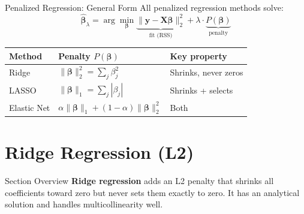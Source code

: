 \documentclass[aspectratio=169, 10pt]{beamer}
\begin{document}
\begin{frame}{Penalized Regression: General Form}
  All penalized regression methods solve:
  \[
    \hat{\bm{\beta}}_\lambda
    = \arg\min_{\bm{\beta}}
      \underbrace{\|\mathbf{y} - \mathbf{X}\bm{\beta}\|_2^2}_{\text{fit (RSS)}}
      + \lambda \cdot \underbrace{P(\bm{\beta})}_{\text{penalty}}
  \]

  \medskip
  \begin{center}
    \footnotesize
    \begin{tabular}{lll}
      \toprule
      \textbf{Method} & \textbf{Penalty} $P(\bm{\beta})$ & \textbf{Key property} \\
      \midrule
      Ridge      & $\|\bm{\beta}\|_2^2 = \sum_j \beta_j^2$              & Shrinks, never zeros \\
      LASSO      & $\|\bm{\beta}\|_1 = \sum_j |\beta_j|$                & Shrinks + selects \\
      Elastic Net & $\alpha\|\bm{\beta}\|_1 + (1-\alpha)\|\bm{\beta}\|_2^2$ & Both \\
      \bottomrule
    \end{tabular}
  \end{center}

  \medskip
\end{frame}

\section{Ridge Regression (L2)}


\begin{frame}{Section Overview}
  \textbf{Ridge regression} adds an L2 penalty that shrinks all coefficients
  toward zero but never sets them exactly to zero. It has an analytical
  solution and handles multicollinearity well.
\end{frame}
\end{document}
